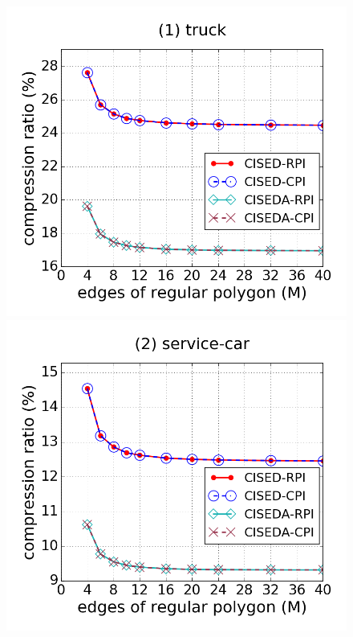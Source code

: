 \begin{figure}[tb!]
\centering
\includegraphics[scale = 0.250]{figures/Exp-M-e-60-CR-truck.png}
\includegraphics[scale = 0.250]{figures/Exp-M-e-60-CR-service.png}

\end{figure}

